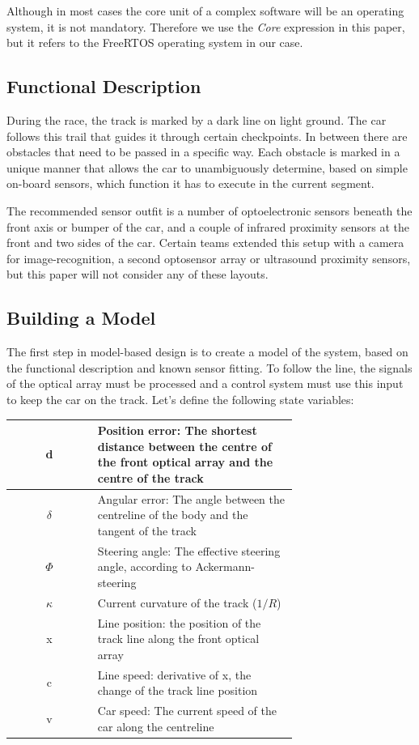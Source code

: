 Although in most cases the core unit of a complex software will be an operating system, it is not mandatory. Therefore we use the \emph{Core} expression in this paper, but it refers to the \textsf{FreeRTOS} operating system in our case.

\subsection{Functional Description}

During the race, the track is marked by a dark line on light ground. The car follows this trail that guides it through certain checkpoints. In between there are obstacles that need to be passed in a specific way. Each obstacle is marked in a unique manner that allows the car to unambiguously determine, based on simple on-board sensors, which function it has to execute in the current segment.

The recommended sensor outfit\cite{sensors} is a number of optoelectronic sensors beneath the front axis or bumper of the car, and a couple of infrared proximity sensors at the front and two sides of the car. Certain teams extended this setup with a camera for image-recognition, a second optosensor array or ultrasound proximity sensors, but this paper will not consider any of these layouts.

\subsection{Building a Model}

The first step in model-based design is to create a model of the system, based on the functional description and known sensor fitting. To follow the line, the signals of the optical array must be processed and a control system must use this input to keep the car on the track. Let's define the following state variables:

\begin{center}
  \begin{tabular}{| c | p{0.7\linewidth} |}
\hline
    d & Position error: The shortest distance between the centre of the front optical array and the centre of the track \\ \hline
    $ \delta $ & Angular error: The angle between the centreline of the body and the tangent of the track \\ \hline
    $ \Phi $ & Steering angle: The effective steering angle, according to Ackermann-steering \\
    \hline
    $ \kappa $ & Current curvature of the track ($1/R$) \\ \hline
    x & Line position: the position of the track line along the front optical array \\ \hline
    c & Line speed: derivative of x, the change of the track line position \\ \hline
    v & Car speed: The current speed of the car along the centreline \\
    \hline
  \end{tabular}
\end{center}


